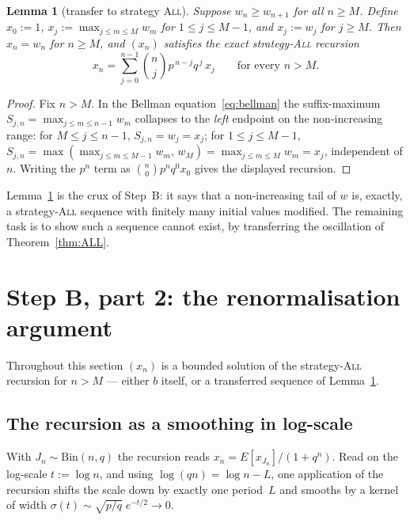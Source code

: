 \documentclass[11pt]{article}
\newtheorem{lemma}[theorem]{Lemma}
\theoremstyle{definition}
\newcommand{\All}{\textsc{All}}
\begin{document}
\begin{lemma}[transfer to strategy \All]\label{lem:transfer}
  Suppose $w_n\ge w_{n+1}$ for all $n\ge M$. Define $x_0:=1$,
  $x_j:=\max_{j\le m\le M}w_m$ for $1\le j\le M-1$, and $x_j:=w_j$ for
  $j\ge M$. Then $x_n=w_n$ for $n\ge M$, and $(x_n)$ satisfies the
  exact strategy-\All{} recursion
  \[
    x_n=\sum_{j=0}^{n-1}\binom nj p^{\,n-j}q^{\,j}\,x_j
    \qquad\text{for every }n>M .
  \]
\end{lemma}

\begin{proof}
  Fix $n>M$. In the Bellman equation~\eqref{eq:bellman} the
  suffix-maximum $S_{j,n}=\max_{j\le m\le n-1}w_m$ collapses to the
  \emph{left} endpoint on the non-increasing range: for $M\le j\le
  n-1$, $S_{j,n}=w_j=x_j$; for $1\le j\le M-1$,
  $S_{j,n}=\max(\max_{j\le m\le M-1}w_m,\,w_M)=\max_{j\le m\le
  M}w_m=x_j$, independent of $n$. Writing the $p^n$ term as
  $\binom n0p^nq^0x_0$ gives the displayed recursion.
\end{proof}

Lemma~\ref{lem:transfer} is the crux of Step~B: it says that a
non-increasing tail of $w$ is, exactly, a strategy-\All{} sequence
with finitely many initial values modified. The remaining task is to
show such a sequence cannot exist, by transferring the oscillation of
Theorem~\ref{thm:ALL}.

\section{Step B, part 2: the renormalisation argument}\label{sec:renorm}

Throughout this section $(x_n)$ is a bounded solution of the
strategy-\All{} recursion for $n>M$ --- either $b$ itself, or a
transferred sequence of Lemma~\ref{lem:transfer}.

\subsection{The recursion as a smoothing in log-scale}

With $J_n\sim\mathrm{Bin}(n,q)$ the recursion reads
$x_n=E[x_{J_n}]/(1+q^n)$. Read on the log-scale $t:=\log n$, and using
$\log(qn)=\log n-L$, one application of the recursion shifts the scale
down by exactly one period~$L$ and smooths by a kernel of width
$\sigma(t)\sim\sqrt{p/q}\;e^{-t/2}\to0$.
\end{document}
